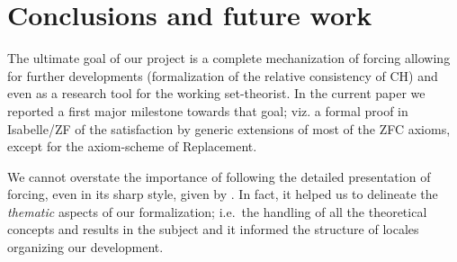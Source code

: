 \section{Conclusions and future work}
\label{sec:conclusions-future-work}



The ultimate goal of our project is a complete mechanization of
forcing allowing for further developments (formalization of the
relative consistency of CH) and even as a research tool for the
working set-theorist. In the current paper we reported a first major
milestone towards that goal; viz. a formal proof in Isabelle/ZF of the
satisfaction by generic extensions of most of the ZFC axioms, except
for the axiom-scheme of Replacement.

We cannot overstate the importance of following the detailed
presentation of forcing, even in its sharp style, given by
\citet{kunen2011set}. In fact, it helped us to delineate the
\emph{thematic} aspects of our formalization; i.e.~the handling of all
the theoretical concepts and results in the subject and it informed
the structure of locales organizing our development.


